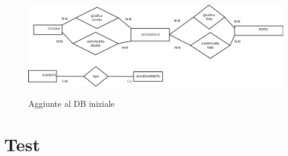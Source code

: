 	\begin{figure}
		\includegraphics[scale=0.35]{images/DBplus.png}\\[1cm] \caption{Aggiunte al DB iniziale}
	\end{figure}
	\newpage
	\section{Test}
	
	
	
